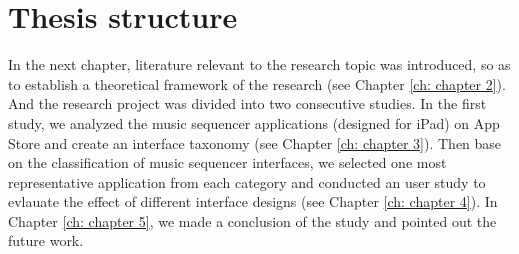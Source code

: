 \section{Thesis structure}

In the next chapter, literature relevant to the research topic was introduced, so as to establish a theoretical framework of the research (see Chapter \ref{ch: chapter 2}). And the research project was divided into two consecutive studies. In the first study, we analyzed the music sequencer applications (designed for iPad) on App Store and create an interface taxonomy (see Chapter \ref{ch: chapter 3}). Then base on the classification of music sequencer interfaces, we selected one most representative application from each category and conducted an user study to evlauate the effect of different interface designs (see Chapter \ref{ch: chapter 4}). In Chapter \ref{ch: chapter 5}, we made a conclusion of the study and pointed out the future work.
